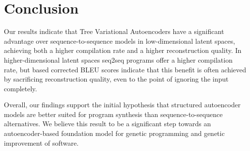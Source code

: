 \newpage
\section{Conclusion}

Our results indicate that Tree Variational Autoencoders have a significant advantage over sequence-to-sequence models in low-dimensional latent spaces, achieving both a higher compilation rate and a higher reconstruction quality.
In higher-dimensional latent spaces seq2seq programs offer a higher compilation rate, but based corrected BLEU scores indicate that this benefit is often achieved by sacrificing reconstruction quality, even to the point of ignoring the input completely.

Overall, our findings support the initial hypothesis that structured autoencoder models are better suited for program synthesis than sequence-to-sequence alternatives.
We believe this result to be a significant step towards an autoencoder-based foundation model for genetic programming and genetic improvement of software.
